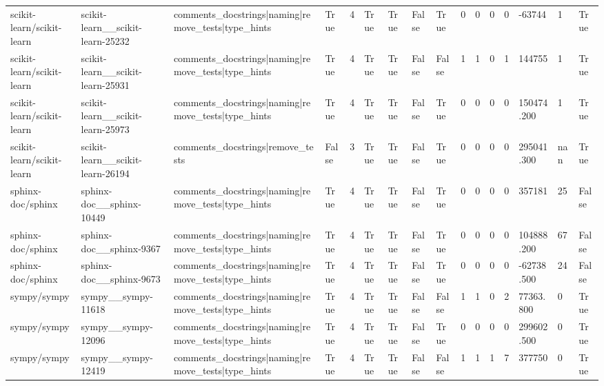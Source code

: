 \begin{tabular}{llllllllllllllll}
scikit-learn/scikit-learn & scikit-learn\_\_scikit-learn-25232 & comments\_docstrings|naming|remove\_tests|type\_hints & True & 4 & True & True & False & True & 0 & 0 & 0 & 0 & -63744 & 1 & True \\
scikit-learn/scikit-learn & scikit-learn\_\_scikit-learn-25931 & comments\_docstrings|naming|remove\_tests|type\_hints & True & 4 & True & True & False & False & 1 & 1 & 0 & 1 & 144755 & 1 & True \\
scikit-learn/scikit-learn & scikit-learn\_\_scikit-learn-25973 & comments\_docstrings|naming|remove\_tests|type\_hints & True & 4 & True & True & False & True & 0 & 0 & 0 & 0 & 150474.200 & 1 & True \\
scikit-learn/scikit-learn & scikit-learn\_\_scikit-learn-26194 & comments\_docstrings|remove\_tests & False & 3 & True & True & False & True & 0 & 0 & 0 & 0 & 295041.300 & nan & True \\
sphinx-doc/sphinx & sphinx-doc\_\_sphinx-10449 & comments\_docstrings|naming|remove\_tests|type\_hints & True & 4 & True & True & False & True & 0 & 0 & 0 & 0 & 357181 & 25 & False \\
sphinx-doc/sphinx & sphinx-doc\_\_sphinx-9367 & comments\_docstrings|naming|remove\_tests|type\_hints & True & 4 & True & True & False & True & 0 & 0 & 0 & 0 & 104888.200 & 67 & False \\
sphinx-doc/sphinx & sphinx-doc\_\_sphinx-9673 & comments\_docstrings|naming|remove\_tests|type\_hints & True & 4 & True & True & False & True & 0 & 0 & 0 & 0 & -62738.500 & 24 & False \\
sympy/sympy & sympy\_\_sympy-11618 & comments\_docstrings|naming|remove\_tests|type\_hints & True & 4 & True & True & False & False & 1 & 1 & 0 & 2 & 77363.800 & 0 & True \\
sympy/sympy & sympy\_\_sympy-12096 & comments\_docstrings|naming|remove\_tests|type\_hints & True & 4 & True & True & False & True & 0 & 0 & 0 & 0 & 299602.500 & 0 & True \\
sympy/sympy & sympy\_\_sympy-12419 & comments\_docstrings|naming|remove\_tests|type\_hints & True & 4 & True & True & False & False & 1 & 1 & 1 & 7 & 377750 & 0 & True \\
\bottomrule
\end{tabular}
